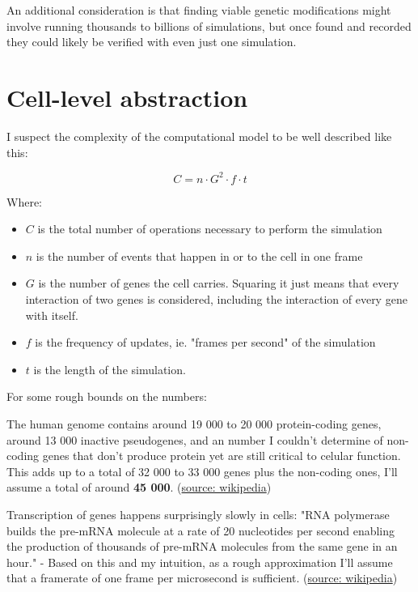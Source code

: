 \documentclass[a4paper]{article}
\begin{document}
	An additional consideration is that finding viable genetic modifications might involve running thousands to billions of simulations, but once found and recorded they could likely be verified with even just one simulation.
	
	\pagebreak
	
	\section{Cell-level abstraction}
	
	I suspect the complexity of the computational model to be well described like this:
	
	$$ C = n \cdot G^2 \cdot f \cdot t $$
	
	Where:
	
	\begin{itemize}
		\item $C$ is the total number of operations necessary to perform the simulation
		
		\item $n$ is the number of events that happen in or to the cell in one frame
		
		\item $G$ is the number of genes the cell carries. Squaring it just means that every interaction of two genes is considered, including the interaction of every gene with itself.
		
		\item $f$ is the frequency of updates, ie. "frames per second" of the simulation
		
		\item $t$ is the length of the simulation.
	\end{itemize}
	
	For some rough bounds on the numbers:
	
	\medskip
	
	The human genome contains around 19 000 to 20 000 protein-coding genes, around 13 000 inactive pseudogenes, and an number I couldn't determine of non-coding genes that don't produce protein yet are still critical to celular function. This adds up to a total of 32 000 to 33 000 genes plus the non-coding ones, I'll assume a total of around \textbf{45 000}. (\href{https://en.wikipedia.org/wiki/Human_genome#Molecular_organization_and_gene_content}{source: wikipedia})
	
	\medskip
	
	Transcription of genes happens surprisingly slowly in cells: "RNA polymerase builds the pre-mRNA molecule at a rate of 20 nucleotides per second enabling the production of thousands of pre-mRNA molecules from the same gene in an hour." - Based on this and my intuition, as a rough approximation I'll assume that a framerate of one frame per microsecond is sufficient. (\href{https://en.wikipedia.org/wiki/Protein_biosynthesis#Transcription}{source: wikipedia})
	
\end{document}
